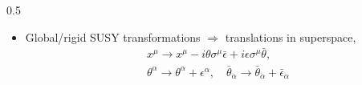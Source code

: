 \documentclass[10pt,aspectratio=169]{beamer}
\begin{document}
\begin{frame}
\begin{columns}[t]
\begin{column}{0.5\textwidth}
\begin{itemize}
\begin{equation*}
            + \epsilon \hat{Q} + \bar{\epsilon} \hat{\bar{Q}} \right )
            \right ]
        \end{equation*}
      \item Global/rigid SUSY transformations $\Rightarrow$ {  \color{blue}
        translations in superspace},
        \begin{gather*}
          x^\mu \to x^\mu - i \theta \sigma^\mu \bar{\epsilon}
          + i \epsilon \sigma^\mu \bar{\theta} , \\
          \theta^\alpha \to \theta^\alpha + \epsilon^\alpha , \quad
          \bar{\theta}_{\dot{\alpha}} \to \bar{\theta}_{\dot{\alpha}} +
          \bar{\epsilon}_{\dot{\alpha}}
        \end{gather*}
      \end{itemize}
    \end{column}
  \end{columns}
\end{frame}

\end{document}
